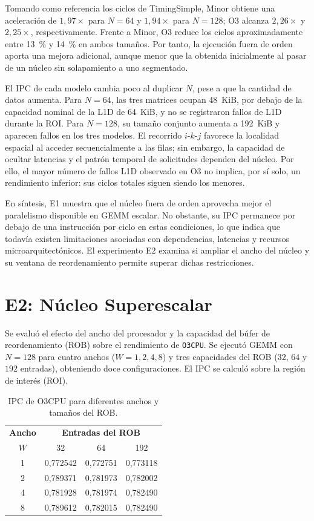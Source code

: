 \documentclass[journal]{IEEEtran}
\begin{document}
Tomando como referencia los ciclos de TimingSimple, Minor obtiene
una aceleración de $1{,}97\times$ para $N=64$ y $1{,}94\times$
para $N=128$; O3 alcanza $2{,}26\times$ y $2{,}25\times$,
respectivamente. Frente a Minor, O3 reduce los ciclos
aproximadamente entre \SI{13}{\percent} y \SI{14}{\percent} en ambos tamaños. Por tanto,
la ejecución fuera de orden aporta una mejora adicional, aunque
menor que la obtenida inicialmente al pasar de un núcleo sin
solapamiento a uno segmentado.

El IPC de cada modelo cambia poco al duplicar $N$, pese a que
la cantidad de datos aumenta. Para $N=64$, las tres matrices
ocupan \SI{48}{KiB}, por debajo de la capacidad nominal de la
L1D de \SI{64}{KiB}, y no se registraron fallos de L1D durante
la ROI. Para $N=128$, su tamaño conjunto aumenta a
\SI{192}{KiB} y aparecen fallos en los tres modelos. El
recorrido $i$-$k$-$j$ favorece la localidad espacial al acceder
secuencialmente a las filas; sin embargo, la capacidad de
ocultar latencias y el patrón temporal de solicitudes dependen
del núcleo. Por ello, el mayor número de fallos L1D observado
en O3 no implica, por sí solo, un rendimiento inferior: sus
ciclos totales siguen siendo los menores.

En síntesis, E1 muestra que el núcleo fuera de orden aprovecha
mejor el paralelismo disponible en GEMM escalar. No obstante,
su IPC permanece por debajo de una instrucción por ciclo en
estas condiciones, lo que indica que todavía existen
limitaciones asociadas con dependencias, latencias y recursos
microarquitectónicos. El experimento E2 examina si ampliar el
ancho del núcleo y su ventana de reordenamiento permite
superar dichas restricciones.


\section{E2: Núcleo Superescalar}

Se evaluó el efecto del ancho del procesador y la capacidad
del búfer de reordenamiento (ROB) sobre el rendimiento de
\texttt{O3CPU}. Se ejecutó GEMM con $N=128$ para cuatro
anchos ($W=1,2,4,8$) y tres capacidades del ROB
($32$, $64$ y $192$ entradas), obteniendo doce
configuraciones. El IPC se calculó sobre la región
de interés (ROI).

\begin{table}[!ht]
\centering
\caption{IPC de O3CPU para diferentes anchos y tamaños del ROB.}
\label{tab:e2_ipc}
\setlength{\tabcolsep}{5pt}
\begin{tabular}{c|ccc}
\hline
\textbf{Ancho} & \multicolumn{3}{c}{\textbf{Entradas del ROB}}\\
$W$ & 32 & 64 & 192\\
\hline
1 & 0{,}772542 & 0{,}772751 & 0{,}773118\\
2 & 0{,}789371 & 0{,}781973 & 0{,}782002\\
4 & 0{,}781928 & 0{,}781974 & 0{,}782490\\
8 & 0{,}789612 & 0{,}782015 & 0{,}782490\\
\hline
\end{tabular}
\end{table}
\end{document}
